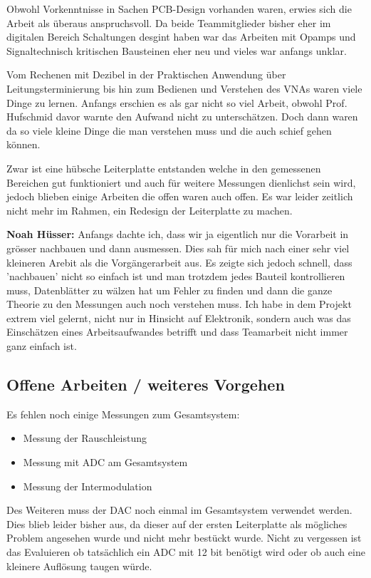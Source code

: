 Obwohl Vorkenntnisse in Sachen PCB-Design vorhanden waren, erwies sich die Arbeit als überaus anspruchsvoll. Da beide Teammitglieder bisher eher im digitalen Bereich Schaltungen desgint haben war das Arbeiten mit Opamps und Signaltechnisch kritischen Bausteinen eher neu und vieles war anfangs unklar.

Vom Rechenen mit Dezibel in der Praktischen Anwendung über Leitungsterminierung bis hin zum Bedienen und Verstehen des VNAs waren viele Dinge zu lernen. Anfangs erschien es als gar nicht so viel Arbeit, obwohl Prof. Hufschmid davor warnte den Aufwand nicht zu unterschätzen. Doch dann waren da so viele kleine Dinge die man verstehen muss und die auch schief gehen können.

Zwar ist eine hübsche Leiterplatte entstanden welche in den gemessenen Bereichen gut funktioniert und auch für weitere Messungen dienlichst sein wird, jedoch blieben einige Arbeiten die offen waren auch offen.
Es war leider zeitlich nicht mehr im Rahmen, ein Redesign der Leiterplatte zu machen.

\textbf{Noah Hüsser:} Anfangs dachte ich, dass wir ja eigentlich nur die Vorarbeit in grösser nachbauen und dann ausmessen. Dies sah für mich nach einer sehr viel kleineren Arebit als die Vorgängerarbeit aus. Es zeigte sich jedoch schnell, dass 'nachbauen' nicht so einfach ist und man trotzdem jedes Bauteil kontrollieren muss, Datenblätter zu wälzen hat um Fehler zu finden und dann die ganze Theorie zu den Messungen auch noch verstehen muss. Ich habe in dem Projekt extrem viel gelernt, nicht nur in Hinsicht auf Elektronik, sondern auch was das Einschätzen eines Arbeitsaufwandes betrifft und dass Teamarbeit nicht immer ganz einfach ist.

\subsection*{Offene Arbeiten / weiteres Vorgehen}
Es fehlen noch einige Messungen zum Gesamtsystem:
\begin{itemize}
    \item Messung der Rauschleistung
    \item Messung mit ADC am Gesamtsystem
    \item Messung der Intermodulation
\end{itemize}

Des Weiteren muss der DAC noch einmal im Gesamtsystem verwendet werden. Dies blieb leider bisher aus, da dieser auf der ersten Leiterplatte als mögliches Problem angesehen wurde und nicht mehr bestückt wurde.
Nicht zu vergessen ist das Evaluieren ob tatsächlich ein ADC mit 12 bit benötigt wird oder ob auch eine kleinere Auflösung taugen würde.


